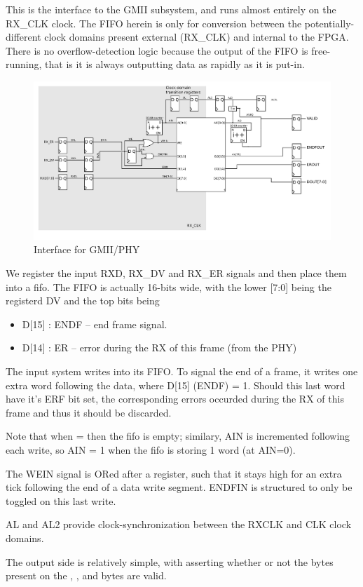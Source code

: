 This is the interface to the GMII subsystem, and runs almost entirely
on the RX_CLK clock. The FIFO herein is only for conversion between
the potentially-different clock domains present external (RX_CLK) and
internal to the FPGA. There is no overflow-detection logic because the
output of the FIFO is free-running, that is it is always outputting
data as rapidly as it is put-in.

\begin{figure}
\label{gmii}
\includegraphics[scale=0.7]{gmii.svg}
\caption{Interface for GMII/PHY}
\end{figure}

We register the input RXD, RX_DV and RX_ER signals and then place them
into a fifo. The FIFO is actually 16-bits wide, with the lower [7:0]
being the registerd DV and the top bits being
\begin{itemize}
\item  D[15] : ENDF -- end frame signal. 
\item  D[14] : ER   -- error during the RX of this frame (from the PHY)
\end{itemize}

The input system writes into its FIFO. To signal the end of a frame,
it writes one extra word following the data, where D[15] (ENDF) =
1. Should this last word have it's ERF bit set, the
corresponding errors occurded during the RX of this frame and thus it
should be discarded.

Note that when  =  then the fifo is empty;
similary, AIN is incremented following each write, so AIN = 1 when the
fifo is storing 1 word (at AIN=0).

The WEIN signal is ORed after a register, such that it stays high for
an extra tick following the end of a data write segment. ENDFIN is
structured to only be toggled on this last write.

AL and AL2 provide clock-synchronization between the RXCLK and CLK
clock domains. 

The output side is relatively simple, with  asserting
whether or not the bytes present on the ,
, and  bytes are valid.
